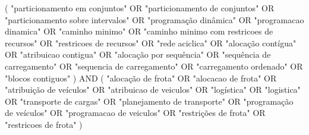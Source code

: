 (
    "particionamento em conjuntos"
        OR "particionamento de conjuntos"
        OR "particionamento sobre intervalos"
        OR "programação dinâmica"
        OR "programacao dinamica"
        OR "caminho minimo"
        OR "caminho minimo com
           restricoes de recursos"
        OR "restricoes de
           recursos"
        OR "rede aciclica"
        OR "alocação contígua"
        OR "atribuicao contigua"
        OR "alocação por sequência"
        OR "sequência de carregamento"
        OR "sequencia de carregamento"
        OR "carregamento ordenado"
        OR "blocos contiguos"
) AND (
    "alocação de frota"
        OR "alocacao de frota"
        OR "atribuição de veículos"
        OR "atribuicao de veiculos"
        OR "logística"
        OR "logistica"
        OR "transporte de cargas"
        OR "planejamento de transporte"
        OR "programação de veículos"
        OR "programacao de veiculos"
        OR "restrições de frota"
        OR "restricoes de frota"
)
